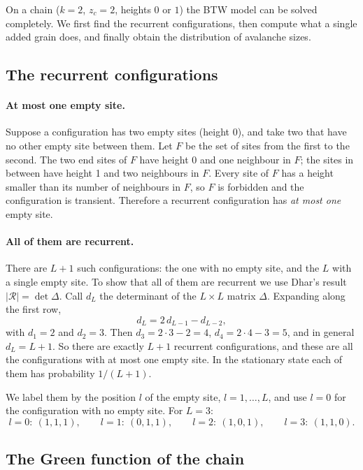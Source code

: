 On a chain ($k=2$, $z_c=2$, heights $0$ or $1$) the BTW model can be solved completely. We first find the recurrent
configurations, then compute what a single added grain does, and finally obtain the distribution of avalanche sizes.

\subsection{The recurrent configurations}

\paragraph{At most one empty site.} Suppose a configuration has two empty sites (height 0), and take two that have no
other empty site between them. Let $F$ be the set of sites from the first to the second. The two end sites of $F$ have
height 0 and one neighbour in $F$; the sites in between have height 1 and two neighbours in $F$. Every site of $F$ has a
height smaller than its number of neighbours in $F$, so $F$ is forbidden and the configuration is transient. Therefore a
recurrent configuration has \emph{at most one} empty site.

\paragraph{All of them are recurrent.} There are $L+1$ such configurations: the one with no empty site, and the $L$ with a
single empty site. To show that all of them are recurrent we use Dhar's result $|\mathcal R| = \det\Delta$. Call $d_L$ the
determinant of the $L\times L$ matrix $\Delta$. Expanding along the first row,
\begin{equation}
  d_L = 2\,d_{L-1} - d_{L-2},
\end{equation}
with $d_1 = 2$ and $d_2 = 3$. Then $d_3 = 2\cdot3-2 = 4$, $d_4 = 2\cdot4-3 = 5$, and in general $d_L = L+1$. So there are
exactly $L+1$ recurrent configurations, and these are all the configurations with at most one empty site. In the
stationary state each of them has probability $1/(L+1)$.

We label them by the position $l$ of the empty site, $l = 1,\dots,L$, and use $l=0$ for the configuration with no empty
site. For $L=3$:
\[
  l=0:\ (1,1,1),\qquad l=1:\ (0,1,1),\qquad l=2:\ (1,0,1),\qquad l=3:\ (1,1,0).
\]

\subsection{The Green function of the chain}

